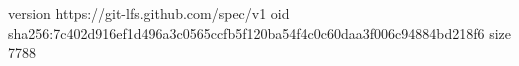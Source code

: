 version https://git-lfs.github.com/spec/v1
oid sha256:7c402d916ef1d496a3c0565ccfb5f120ba54f4c0c60daa3f006c94884bd218f6
size 7788
